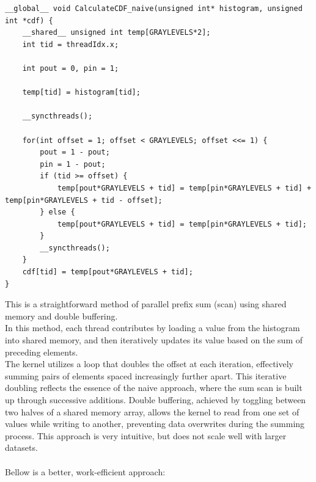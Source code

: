 \documentclass[10pt]{article}
\begin{document}
\begin{lstlisting}[style=cppstyle]
__global__ void CalculateCDF_naive(unsigned int* histogram, unsigned int *cdf) {
    __shared__ unsigned int temp[GRAYLEVELS*2];
    int tid = threadIdx.x;

    int pout = 0, pin = 1;

    temp[tid] = histogram[tid];

    __syncthreads();

    for(int offset = 1; offset < GRAYLEVELS; offset <<= 1) {
        pout = 1 - pout;
        pin = 1 - pout;
        if (tid >= offset) {
            temp[pout*GRAYLEVELS + tid] = temp[pin*GRAYLEVELS + tid] + temp[pin*GRAYLEVELS + tid - offset];
        } else {
            temp[pout*GRAYLEVELS + tid] = temp[pin*GRAYLEVELS + tid];
        }
        __syncthreads();
    }
    cdf[tid] = temp[pout*GRAYLEVELS + tid];
}
\end{lstlisting}
\vspace{2cm}
This is a straightforward method of parallel prefix sum (scan) using shared memory and double buffering.\\ In this method, each thread contributes by loading a value from the histogram into shared memory, and then iteratively updates its value based on the sum of preceding elements.\\ The kernel utilizes a loop that doubles the offset at each iteration, effectively summing pairs of elements spaced increasingly further apart. This iterative doubling reflects the essence of the naive approach, where the sum scan is built up through successive additions. Double buffering, achieved by toggling between two halves of a shared memory array, allows the kernel to read from one set of values while writing to another, preventing data overwrites during the summing process. This approach is very intuitive, but does not scale well with larger datasets.\\\\

\pagebreak
Bellow is a better, work-efficient approach:
\end{document}
